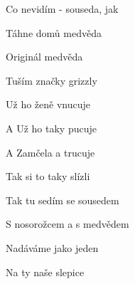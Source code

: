 \begin{song}
\bigskip

Co nevidím - souseda, jak \par
{}Táhne domů medvěda \par
{}Originál medvěda \par
{}Tuším značky grizzly \par
{}Už ho ženě vnucuje \par
A Už ho taky pucuje \par
A Zamčela a trucuje \par
Tak si to taky slízli \par

\bigskip

Tak tu sedím se sousedem \par
{}S nosorožcem a s medvědem \par
{}Nadáváme jako jeden \par
{}Na ty naše slepice \par

\end{song}
